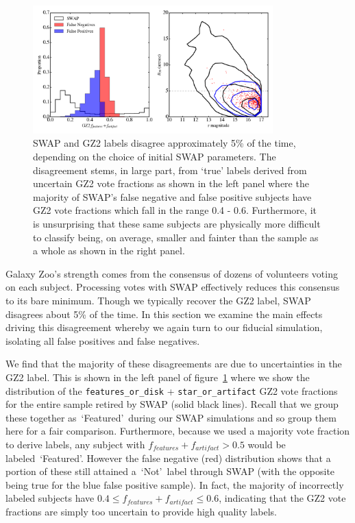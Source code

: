 \documentclass[twocolumn]{aastex6}
\newcommand{\feat}{`Featured'}
\newcommand{\notfeat}{`Not'}
\begin{document}
\begin{figure}[t!]
\includegraphics[width=3.65in]{figures/swapgetsitwrong_test.png}
\caption{SWAP and GZ2 labels disagree approximately 5\% of the time, depending on the choice
of initial SWAP parameters. The disagreement stems, in large part, from `true' labels derived from uncertain GZ2 vote fractions as shown in the left panel where the  majority of SWAP's false negative and false positive subjects have GZ2 vote fractions which fall in the range 0.4 - 0.6. Furthermore, it is unsurprising that these same subjects are physically more difficult to classify being, on average, smaller and fainter than the sample as a whole as shown in the right panel. \label{fig: SWAP sucks}}
\end{figure}

Galaxy Zoo's strength comes from the consensus of dozens of volunteers voting on each subject. 
Processing votes with SWAP effectively reduces this consensus to its bare minimum. 
Though we typically recover the GZ2 label, SWAP disagrees about 5\% of the time. 
In this section we examine the main effects driving this disagreement whereby we again
 turn to our fiducial simulation, isolating all false positives and false negatives. 

We find that the majority of these disagreements are due to uncertainties in the GZ2
label. This is shown in the left panel of figure~\ref{fig: SWAP sucks} where we show
the distribution of the \texttt{features\_or\_disk} + \texttt{star\_or\_artifact} GZ2 vote 
fractions for the entire sample retired by SWAP (solid black lines). 
Recall that we group these together as~\feat~during  our SWAP simulations and so 
group them here for a fair comparison. Furthermore, because we used a majority vote
fraction to derive labels, any subject with $ f_{features}+f_{artifact} > 0.5$ would be
labeled~\feat.  However the false negative (red) distribution shows that a portion 
of these still attained a~\notfeat~label through SWAP (with the opposite being 
true for the blue false positive sample). In fact, the majority of incorrectly labeled 
subjects have $0.4 \le f_{features}+f_{artifact} \le 0.6$,
indicating that the GZ2 vote fractions are simply too uncertain to provide high quality labels. 
\end{document}
